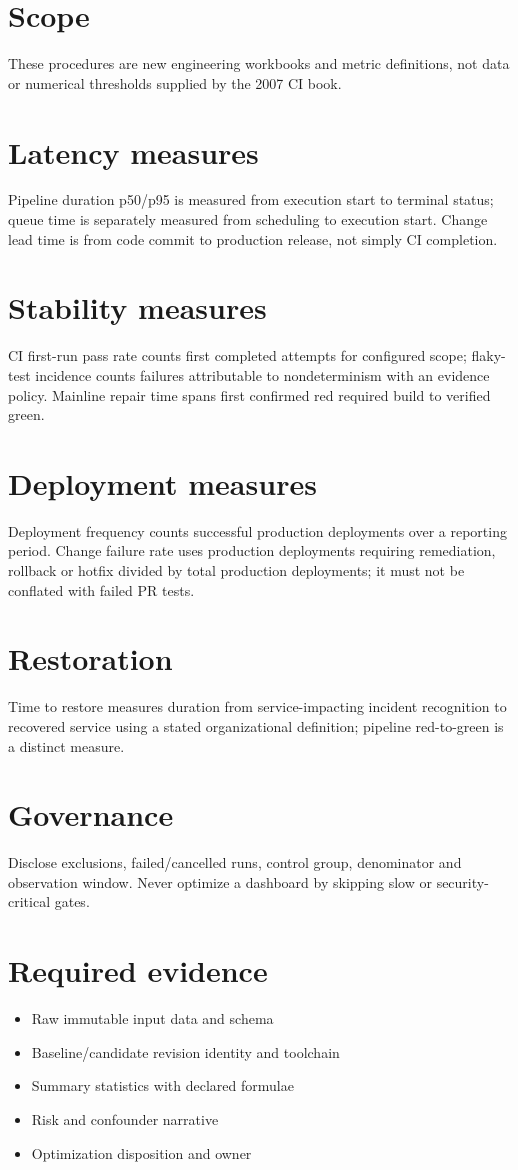 \documentclass[11pt,letterpaper]{article}
\begin{document}
\makedoctitle
\makedocsummary
\tableofcontents
\clearpage
\section{Scope}
These procedures are new engineering workbooks and metric definitions, not data or numerical thresholds supplied by the 2007 CI book.

\section{Latency measures}
Pipeline duration p50/p95 is measured from execution start to terminal status; queue time is separately measured from scheduling to execution start. Change lead time is from code commit to production release, not simply CI completion.

\section{Stability measures}
CI first-run pass rate counts first completed attempts for configured scope; flaky-test incidence counts failures attributable to nondeterminism with an evidence policy. Mainline repair time spans first confirmed red required build to verified green.

\section{Deployment measures}
Deployment frequency counts successful production deployments over a reporting period. Change failure rate uses production deployments requiring remediation, rollback or hotfix divided by total production deployments; it must not be conflated with failed PR tests.

\section{Restoration}
Time to restore measures duration from service-impacting incident recognition to recovered service using a stated organizational definition; pipeline red-to-green is a distinct measure.

\section{Governance}
Disclose exclusions, failed/cancelled runs, control group, denominator and observation window. Never optimize a dashboard by skipping slow or security-critical gates.

\section{Required evidence}
\begin{itemize}
\item Raw immutable input data and schema
\item Baseline/candidate revision identity and toolchain
\item Summary statistics with declared formulae
\item Risk and confounder narrative
\item Optimization disposition and owner
\end{itemize}
\end{document}
